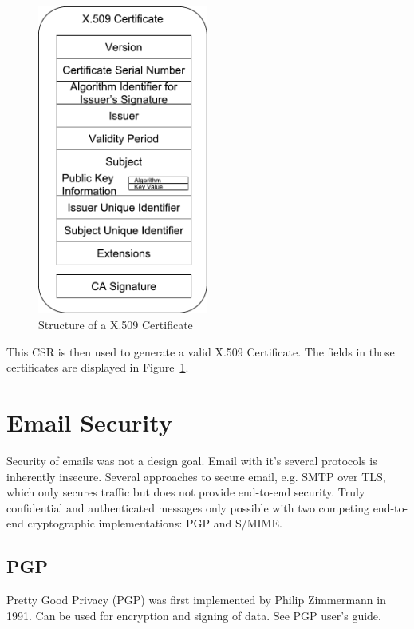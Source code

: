 \begin{figure}
    \centering
    \includegraphics[width=0.5\textwidth]{figures/Structure_of_X509.pdf}
    \caption{Structure of a X.509 Certificate~\cite{jagdish2016certservice}}
    \label{fig:x509Structure}
\end{figure}

This CSR is then used to generate a valid X.509 Certificate.
The fields in those certificates are displayed in Figure~\ref{fig:x509Structure}.

\section{Email Security}\label{sec:emailSecurity}

Security of emails was not a design goal.
Email with it's several protocols is inherently insecure.
Several approaches to secure email, e.g. SMTP over TLS, which only secures traffic but does not provide end-to-end
security.
Truly confidential and authenticated messages only possible with two competing end-to-end cryptographic implementations:
PGP and S/MIME.

\subsection{PGP}\label{subsec:pgp}

Pretty Good Privacy (PGP) was first implemented by Philip Zimmermann in 1991.
Can be used for encryption and signing of data.
See PGP user's guide.

